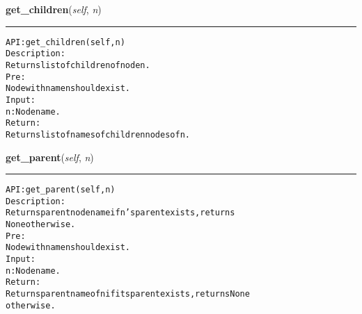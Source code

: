     \label{coinor:gimpy:tree:Tree:get_children}

    \vspace{0.5ex}

\hspace{.8\funcindent}\begin{boxedminipage}{\funcwidth}

    \raggedright \textbf{get\_children}(\textit{self}, \textit{n})

    \vspace{-1.5ex}

    \rule{\textwidth}{0.5\fboxrule}
\setlength{\parskip}{2ex}
\begin{alltt}

API: get\_children(self, n)
Description:
    Returns list of children of node n.
Pre:
    Node with name n should exist.
Input:
    n: Node name.
Return:
    Returns list of names of children nodes of n.
\end{alltt}

\setlength{\parskip}{1ex}
    \end{boxedminipage}

    \label{coinor:gimpy:tree:Tree:get_parent}

    \vspace{0.5ex}

\hspace{.8\funcindent}\begin{boxedminipage}{\funcwidth}

    \raggedright \textbf{get\_parent}(\textit{self}, \textit{n})

    \vspace{-1.5ex}

    \rule{\textwidth}{0.5\fboxrule}
\setlength{\parskip}{2ex}
\begin{alltt}

API: get\_parent(self, n)
Description:
    Returns parent node name if n's parent exists, returns
    None otherwise.
Pre:
    Node with name n should exist.
Input:
    n: Node name.
Return:
    Returns parent name of n if its parent exists, returns None
    otherwise.
\end{alltt}

\setlength{\parskip}{1ex}
    \end{boxedminipage}

